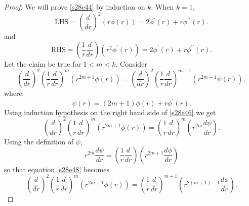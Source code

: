 \documentclass{article}
\newcommand{\td}[2]{\frac{d{#1}}{d{#2}}}
\theoremstyle{plain}
\numberwithin{thm}{section}
\theoremstyle{plain}
\numberwithin{prop}{section}
\theoremstyle{definition}
\numberwithin{defn}{section}
\theoremstyle{remark}
\numberwithin{equation}{section}
\begin{document}
\begin{proof}
We will prove \eqref{s28e44} by induction on $k$. When $k=1$,
\[
\text{LHS}= \left(\frac{d}{dr}\right)^2(r\phi(r)) = 2\phi^\prime(r) + r\phi^{\prime\prime}(r).
\]
and
\[
\text{RHS} = \left(\frac{1}{r}\frac{d}{dr}\right)(r^2\phi^\prime(r)) = 2\phi^\prime(r) + r\phi^{\prime\prime}(r).
\]
Let the claim be true for $1 < m < k$. Consider
\begin{equation}\label{s28e46}
\left(\frac{d}{dr}\right)^2\left(\frac{1}{r}\frac{d}{dr}\right)^{m}\left(r^{2m+1}\phi(r)\right) =
\left(\frac{d}{dr}\right)^2\left(\frac{1}{r}\frac{d}{dr}\right)^{m-1}\left(r^{2m-1}\psi(r)\right),
\end{equation}
where
\begin{equation}\label{s28e47}
\psi(r) = (2m+1)\phi(r) + r\phi^\prime(r).
\end{equation}
Using induction hypothesis on the right hand side of \eqref{s28e46} we get
\begin{equation}\label{s28e48}
\left(\frac{d}{dr}\right)^2\left(\frac{1}{r}\frac{d}{dr}\right)^{m}\left(r^{2m+1}\phi(r)\right) =
\left(\frac{1}{r}\frac{d}{dr}\right)^m\left(r^{2m}\td{\psi}{r}\right).
\end{equation}
Using the definition of $\psi$,
\[
r^{2m}\td{\psi}{r} = \left(\frac{1}{r}\frac{d}{dr}\right)\left(r^{2m+1}\td{\phi}{r}\right)
\]
so that equation \eqref{s28e48} becomes
\[
\left(\frac{d}{dr}\right)^2\left(\frac{1}{r}\frac{d}{dr}\right)^{m}\left(r^{2m+1}\phi(r)\right) =
\left(\frac{1}{r}\frac{d}{dr}\right)^{m+1}\left(r^{2(m+1)-1}\td{\phi}{r}\right).
\]


\end{proof}
\end{document}
